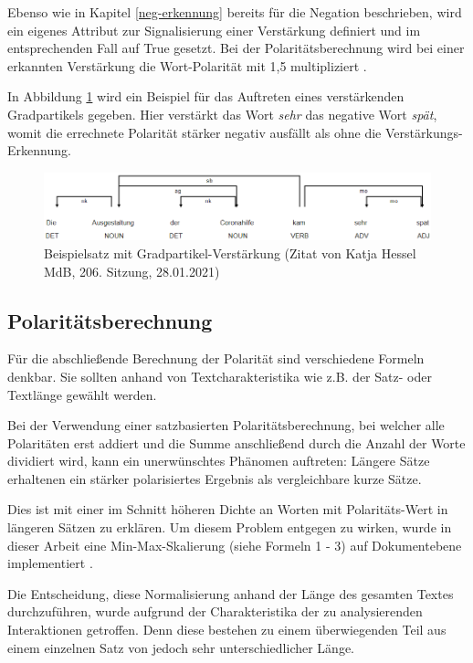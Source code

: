 Ebenso wie in Kapitel \ref{neg-erkennung} bereits für die Negation beschrieben, wird ein eigenes Attribut zur Signalisierung einer Verstärkung definiert und im entsprechenden Fall auf True gesetzt. 
Bei der Polaritätsberechnung wird bei einer erkannten Verstärkung die Wort-Polarität mit 1,5 multipliziert \cite{g3_sentia}. 

In Abbildung \ref{hessel} wird ein Beispiel für das Auftreten eines verstärkenden Gradpartikels gegeben. 
Hier verstärkt das Wort \textit{sehr} das negative Wort \textit{spät}, womit die errechnete Polarität stärker negativ ausfällt als ohne die Verstärkungs-Erkennung. 

\begin{figure}[htb]
\centerline{\includegraphics[width=1\textwidth]{chapters/04-Sentiment-Analyse/hessel.png}}
\caption{Beispielsatz mit Gradpartikel-Verstärkung (Zitat von Katja Hessel MdB, 206. Sitzung, 28.01.2021)}
\label{hessel}
\end{figure}

\subsection{Polaritätsberechnung}
\label{polberechnung}
Für die abschließende Berechnung der Polarität sind verschiedene Formeln denkbar. 
Sie sollten anhand von Textcharakteristika wie z.B. der Satz- oder Textlänge gewählt werden. 

Bei der Verwendung einer satzbasierten Polaritätsberechnung, bei welcher alle Polaritäten erst addiert und die Summe anschließend durch die Anzahl der Worte dividiert wird, kann ein unerwünschtes Phänomen auftreten: 
Längere Sätze erhaltenen ein stärker polarisiertes Ergebnis als vergleichbare kurze Sätze. 

Dies ist mit einer im Schnitt höheren Dichte an Worten mit Polaritäts-Wert in längeren Sätzen zu erklären. 
Um diesem Problem entgegen zu wirken, wurde in dieser Arbeit eine Min-Max-Skalierung (siehe Formeln 1 - 3) auf Dokumentebene implementiert \cite{g3_sentia}. 

Die Entscheidung, diese Normalisierung anhand der Länge des gesamten Textes durchzuführen, wurde aufgrund der Charakteristika der zu analysierenden Interaktionen getroffen. 
Denn diese bestehen zu einem überwiegenden Teil aus einem einzelnen Satz von jedoch sehr unterschiedlicher Länge. 

